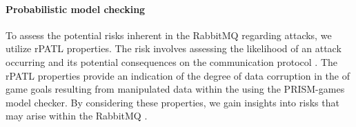 \paragraph{Probabilistic model checking} To assess the potential risks inherent in the RabbitMQ  regarding attacks, we utilize rPATL properties. The risk involves assessing the likelihood of an attack occurring and its potential consequences on the communication protocol \cite{Grzegorz2011}. The rPATL properties provide an indication of the degree of data corruption in the  of game goals resulting from manipulated data within the  using the PRISM-games model checker. By considering these properties, we gain insights into risks that may arise within the RabbitMQ . 





